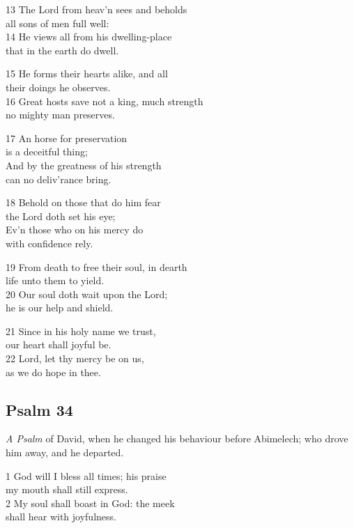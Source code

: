 \begin{multicols}{3}
13 The Lord from heav’n sees and beholds\\
all sons of men full well:\\
14 He views all from his dwelling-place\\
that in the earth do dwell.

15 He forms their hearts alike, and all\\
their doings he observes.\\
16 Great hosts save not a king, much strength\\
no mighty man preserves.

17 An horse for preservation\\
is a deceitful thing;\\
And by the greatness of his strength\\
can no deliv’rance bring.

18 Behold on those that do him fear\\
the Lord doth set his eye;\\
Ev’n those who on his mercy do\\
with confidence rely.

19 From death to free their soul, in dearth\\
life unto them to yield.\\
20 Our soul doth wait upon the Lord;\\
he is our help and shield.

21 Since in his holy name we trust,\\
our heart shall joyful be.\\
22 Lord, let thy mercy be on us,\\
as we do hope in thee.

\begin{center}
\quad{}\quad{}
\end{center}

\subsection*{Psalm 34 }

\emph{A Psalm} of David, when he changed his behaviour before Abimelech; who drove him away, and he departed.

1 God will I bless all times; his praise\\
my mouth shall still express.\\
2 My soul shall boast in God: the meek\\
shall hear with joyfulness.


\end{multicols}
